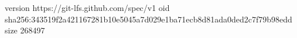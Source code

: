 version https://git-lfs.github.com/spec/v1
oid sha256:343519f2a421167281b10e5045a7d029e1ba71ecb8d81ada0ded2c7f79b98edd
size 268497
